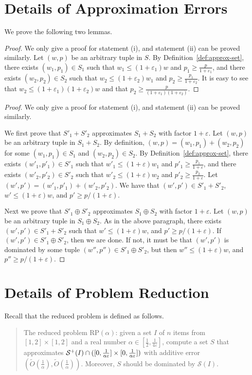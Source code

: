 \documentclass[a4paper,UKenglish,cleveref, autoref, thm-restate, pdfa]{lipics-v2021}
\newcommand{\eps}{\varepsilon}
\renewcommand{\leq}{\leqslant}
\renewcommand{\geq}{\geqslant}
\begin{document}
\section{Details of Approximation Errors}\label{app:err}
We prove the following two lemmas.
\lemapproxerra*
\begin{proof}
    We only give a proof for statement (i), and statement (ii) can be proved similarly. Let $(w,p)$ be an arbitrary tuple in $S$. By Definition~\ref{def:approx-set}, there exists $(w_1, p_1) \in S_1$ such that $w_1 \leq (1 + \eps_1)w $ and $p_1 \geq \frac{p}{1 + \eps_1}$, and there exists $(w_2, p_2) \in S_2$ such that $w_2 \leq (1 + \eps_2)w_1 $ and $p_2 \geq \frac{p_1}{1 + \eps_2}$. It is easy to see that $w_2 \leq (1 + \eps_1)(1 + \eps_2)w$ and that $p_2 \geq \frac{p}{(1 + \eps_1)(1 + \eps_2) }$. 
\end{proof}

\lemapproxerrb*
\begin{proof}
    We only give a proof for statement (i), and statement (ii) can be proved similarly. 

    We first prove that $S'_1 + S'_2$ approximates $S_1 + S_2$ with factor $1 + \eps$. Let $(w,p)$ be an arbitrary tuple in $S_1 + S_2$. By definition, $(w, p) = (w_1, p_1) + (w_2, p_2)$ for some $(w_1, p_1) \in S_1$ and $(w_2, p_2) \in S_2$.  By Definition~\ref{def:approx-set}, there exists $(w'_1, p'_1) \in S'_1$ such that $w'_1 \leq (1 + \eps)w_1 $ and $p'_1 \geq \frac{p_1}{1 + \eps}$, and there exists $(w'_2, p'_2) \in S'_2$ such that $w'_2 \leq (1 + \eps)w_2 $ and $p'_2 \geq \frac{p_2}{1 + \eps}$. Let $(w', p') = (w'_1, p'_1) + (w'_2, p'_2)$.  We have that $(w', p') \in S'_1 + S'_2$, $w' \leq (1 + \eps)w$, and $p' \geq p/(1 + \eps)$. 

    Next we prove that $S'_1 \oplus S'_2$ approximates $S_1 \oplus S_2$ with factor $1 + \eps$.  Let $(w,p)$ be an arbitrary tuple in $S_1 \oplus S_2$.  As in the above paragraph, there exists $(w', p') \in S'_1 + S'_2$ such that $w' \leq (1 + \eps)w$, and $p' \geq p/(1 + \eps)$.  If $(w', p') \in S'_1 \oplus S'_2$, then we are done. If not, it must be that $(w', p')$ is dominated by some tuple $(w'', p'') \in S'_1 \oplus S'_2$, but then $w'' \leq (1 + \eps)w$, and $p'' \geq p/(1 + \eps)$.
\end{proof}

\section{Details of Problem Reduction}\label{app:reducing}
Recall that the reduced problem is defined as follows.
\begin{quote}
The reduced problem $\mathrm{RP}(\alpha)$: given a set $I$ of $n$ items from $[1,2] \times [1,2]$ and a real number $\alpha \in [\frac{1}{2}, \frac{1}{4\eps}]$, compute a set $S$ that approximates ${\cal S}^+(I) \cap ([0,\frac{1}{\alpha\eps}] \times [0, \frac{1}{\alpha\eps}])$ with additive error $(\tilde{O}(\frac{1}{\alpha}), \tilde{O}(\frac{1}{\alpha}))$. Moreover, $S$ should be dominated by $\mathcal{S}(I)$.
\end{quote}
\end{document}
